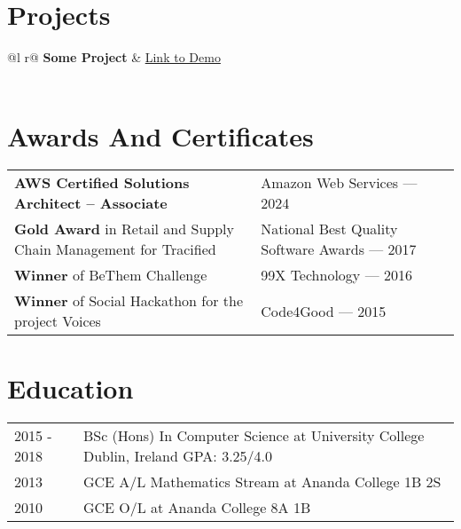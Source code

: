 \documentclass[a4paper,10pt]{article}
\begin{document}
\section{Projects}

\begin{tabularx}{\linewidth}{ @{}l r@{} }
\textbf{Some Project} & \hfill \href{https://some-links.com}{Link to Demo} \\[3.75pt]
  \\
\end{tabularx}

\section{Awards And Certificates}

\begin{tabularx}{\linewidth}{@{}l X r@{}}
\textbf{AWS Certified Solutions Architect – Associate} & \hfill Amazon Web Services — 2024 \\
\textbf{Gold Award} in Retail and Supply Chain Management for Tracified & \hfill National Best Quality Software Awards — 2017 \\
\textbf{Winner} of BeThem Challenge & \hfill 99X Technology — 2016 \\
\textbf{Winner} of Social Hackathon for the project Voices & \hfill Code4Good — 2015 \\
\end{tabularx}

\section{Education}
\begin{tabularx}{\linewidth}{@{}l X@{}}	

2015 - 2018 & BSc (Hons) In Computer Science at University College Dublin, Ireland \hfill GPA: 3.25/4.0 \\ 

2013 & GCE A/L Mathematics Stream at Ananda College \hfill 1B 2S \\

2010 & GCE O/L at Ananda College \hfill 8A 1B \\
\end{tabularx}
\end{document}
